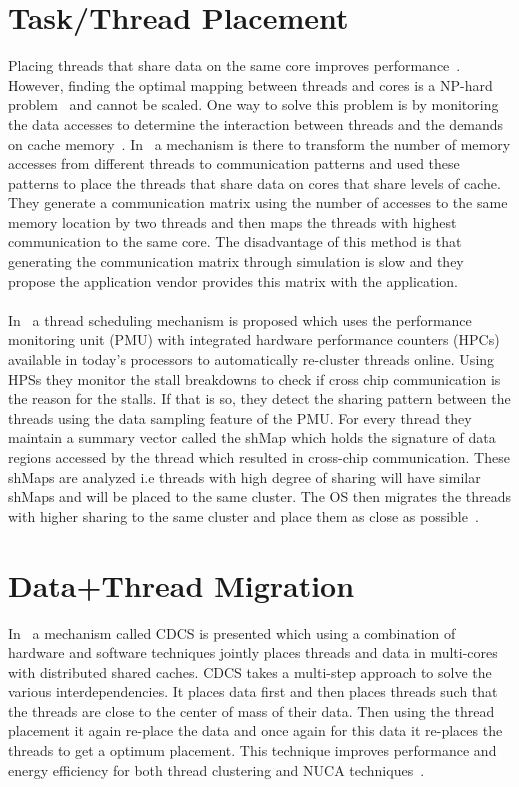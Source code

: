 \documentclass{listhesis}
\begin{document}
\section{Task/Thread Placement}
Placing threads that share data on the same core improves performance~\cite{threadPlacement1}. However, finding the optimal mapping between threads and cores is a NP-hard problem~\cite{threadPlacement2} and cannot be scaled. One way to solve this problem is by monitoring the data accesses to determine the interaction between threads and the demands on cache memory~\cite{threadPlacement3}. In~\cite{threadPlacement3} a mechanism is there to transform the number of memory accesses from different threads to communication patterns and used these patterns to place the threads that share data on cores that share levels of cache.  They generate a communication matrix using the number of accesses to the same memory location by two threads and then maps the threads with highest communication to the same core. The disadvantage of this method is that generating the communication matrix through simulation is slow and they propose the application vendor provides this matrix with the application.\\
\\
In~\cite{threadPlacement4} a thread scheduling mechanism is proposed which uses the performance monitoring unit (PMU) with integrated hardware performance counters (HPCs) available in today’s processors to automatically re-cluster threads online. Using HPSs they monitor the stall breakdowns to check if cross chip communication is the reason for the stalls. If that is so, they detect the sharing pattern between the threads using the data sampling feature of the PMU.  For every thread they maintain a summary vector called the shMap  which holds the signature of data regions accessed by the thread which resulted in cross-chip communication. These shMaps are analyzed i.e threads with high degree of sharing will have similar shMaps and will be placed to the same cluster. The OS then migrates the threads with higher sharing to the same cluster and place them as close as possible~\cite{threadPlacement4}.\\
\section{Data+Thread Migration}
In~\cite{datathreadPlacement} a mechanism called CDCS is presented which using a combination of hardware and software techniques jointly places threads and data in multi-cores with distributed shared caches. CDCS takes a multi-step approach to solve the various interdependencies. It places data first and then places threads such that the threads are close to the center of mass of their data. Then using the thread placement it again re-place the data and once again for this data it re-places the threads to get a optimum placement. This technique improves performance and energy efficiency for both thread clustering and NUCA techniques~\cite{datathreadPlacement}.\\
\end{document}
